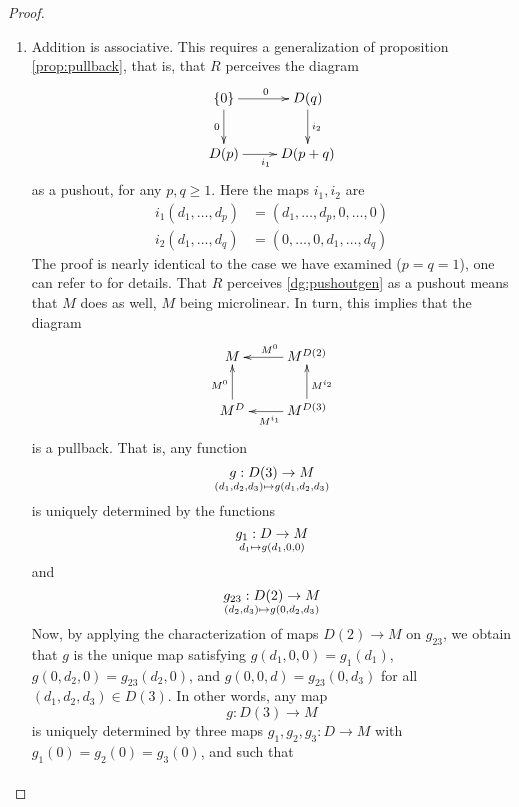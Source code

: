 \begin{proof}
\begin{enumerate}
    \item Addition is associative. This requires a generalization of proposition \ref{prop:pullback}, that is, that \( R \) perceives the diagram
      \begin{equation}
	\xymatrix{
	  {\{0\}} \ar[d]_0 \ar[r]^0   & D(q) \ar[d]^{i_2} \\
	  D(p) \ar[r]_{i_1}              & D(p+q)
	}
	\label{dg:pushoutgen}
      \end{equation}
      as a pushout, for any \( p,q\geq 1 \). Here the maps \( i_1,i_2 \) are
      \begin{align*}
	i_1(d_1,\dots,d_p) &= (d_1,\dots,d_p,0,\dots,0) \\
	i_2(d_1,\dots,d_q) &= (0,\dots,0,d_1,\dots,d_q)
      \end{align*}
      The proof is nearly identical to the case we have examined (\( p=q=1 \)), one can refer to \cite[p. 48]{lav96} for details. That \( R \) perceives \ref{dg:pushoutgen} as a pushout means that \( M \) does as well, \( M \) being microlinear. In turn, this implies that the diagram
      \begin{equation*}
	\xymatrix{
	  M                & M^{D(2)} \ar[l]_{M^0} \\
	  M^D \ar[u]^{M^0} & M^{D(3)} \ar[u]_{M^{i_2}} \ar[l]^{M^{i_1}}
	}
      \end{equation*}
      is a pullback. That is, any function
      \begin{equation*}
	g:D(3)\to M \atop (d_1,d_2,d_3)\mapsto g(d_1,d_2,d_3)
      \end{equation*}
      is uniquely determined by the functions
      \begin{equation*}
	g_1:D\to M \atop d_1\mapsto g(d_1,0,0)
      \end{equation*}
      and
      \begin{equation*}
	g_{23}:D(2)\to M \atop (d_2,d_3) \mapsto g(0,d_2,d_3)
      \end{equation*}
      Now, by applying the characterization of maps \( D(2)\to M \) on \( g_{23} \), we obtain that \( g \) is the unique map satisfying \( g(d_1,0,0)=g_1(d_1) \), \( g(0,d_2,0)=g_{23}(d_2,0) \), and \( g(0,0,d)=g_{23}(0,d_3) \) for all \( (d_1,d_2,d_3)\in D(3) \). In other words, any map
      \begin{equation*}
	g:D(3)\to M
      \end{equation*}
      is uniquely determined by three maps \( g_1,g_2,g_3:D\to M \) with \( g_1(0)=g_2(0)=g_3(0) \), and such that
      \begin{align*}

\end{align*}
\end{enumerate}
\end{proof}

